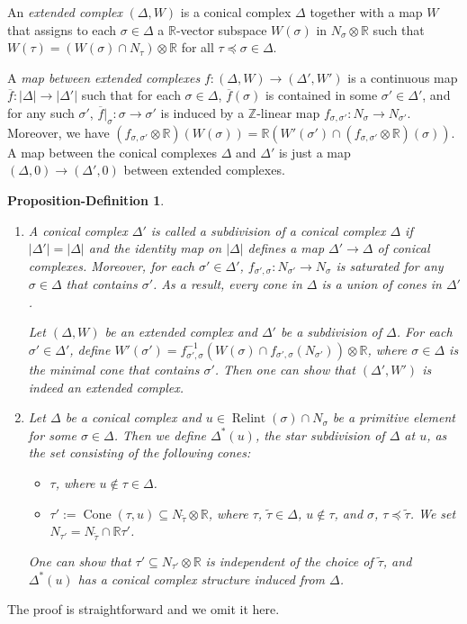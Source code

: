\documentclass[12pt,reqno]{amsart}
\newtheorem{propdef}[theorem]{Proposition-Definition}
\theoremstyle{definition}
\newcommand{\on}{\operatorname}
\newcommand\bR{{\mathbb R}}
\newcommand\bZ{{\mathbb Z}}
\begin{document}
An \emph{extended complex} $(\Delta,W)$ is a conical complex $\Delta$ together with a map $W$ that assigns to each $\sigma\in\Delta$ a $\bR$-vector subspace $W(\sigma)$ in $N_\sigma\otimes\bR$ such that $W(\tau)=(W(\sigma)\cap N_\tau)\otimes\bR$ for all $\tau\preceq\sigma\in\Delta$. 

A \emph{map between extended complexes} $f\colon (\Delta,W)\to (\Delta',W')$ is a continuous map $\overline{f} \colon |\Delta|\to |\Delta'|$ such that for each $\sigma \in \Delta$, $\overline{f}(\sigma)$ is contained in some $\sigma' \in \Delta'$, and for any such $\sigma'$, $\overline{f}\vert_{\sigma}\colon \sigma\to\sigma'$ is induced by a $\bZ$-linear map $f_{\sigma,\sigma'}\colon N_\sigma\to N_{\sigma'}$. Moreover, we have $(f_{\sigma,\sigma'}\otimes\bR)(W(\sigma))=\bR(W'(\sigma')\cap (f_{\sigma,\sigma'}\otimes\bR)(\sigma))$. A map between the conical complexes $\Delta$ and $\Delta'$ is just a map $(\Delta,0)\to(\Delta',0)$ between extended complexes.

\begin{propdef}\label{propdef:star_subdiv_complex}
\begin{enumerate}
\item
    A conical complex $\Delta'$ is called a \emph{subdivision} of a conical complex $\Delta$ if $|\Delta'|=|\Delta|$ and the identity map on $|\Delta|$ defines a map $\Delta'\to \Delta$ of conical complexes. Moreover, for each $\sigma' \in \Delta'$, $f_{\sigma',\sigma}\colon N_{\sigma'}\to N_{\sigma}$ is saturated for any $\sigma \in \Delta$ that contains $\sigma'$. 
    As a result, every cone in $\Delta$ is a union of cones in $\Delta'$. 
     
    Let $(\Delta,W)$ be an extended complex and $\Delta'$ be a subdivision of $\Delta$. For each $\sigma'\in\Delta'$, define $W'(\sigma')=f_{\sigma',\sigma}^{-1}(W(\sigma) \cap f_{\sigma',\sigma}(N_{\sigma'}))\otimes\bR$, where  $\sigma\in\Delta$ is the minimal cone that contains $\sigma'$. Then one can show that  $(\Delta',W')$ is indeed an extended complex. 
\item
    Let $\Delta$ be a conical complex and $u\in \on{Relint}(\sigma)\cap N_\sigma$ be a primitive element for some $\sigma\in\Delta$. 
    Then we define $\Delta^*(u)$, the \emph{star subdivision} of $\Delta$ at $u$, as the set consisting of the following cones:
    \begin{itemize}
        \item $\tau$, where $u\notin\tau\in\Delta$. 
        \item $\tau':=\on{Cone}(\tau,u)\subseteq N_{\widetilde{\tau}}\otimes\bR$, where $\tau$, $\widetilde{\tau}\in \Delta$, $u\notin \tau$, and $\sigma$, $\tau\preceq \widetilde{\tau}$. We set $N_{\tau'}=N_{\widetilde{\tau}}\cap\bR\tau'$. 
    \end{itemize}
    One can show that $\tau'\subseteq N_{\tau'}\otimes\bR$ is independent of the choice of $\widetilde{\tau}$, and $\Delta^*(u)$ has a conical complex structure induced from $\Delta$.
\end{enumerate}
\end{propdef}
The proof is straightforward and we omit it here.
\end{document}
